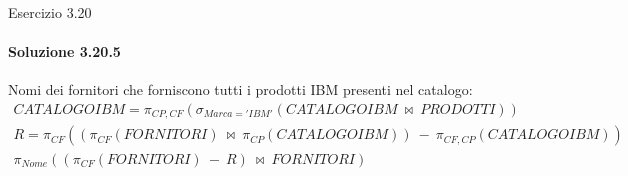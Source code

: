 %
\begin{frame}{Esercizio 3.20}
    \framesubtitle{Soluzione 3.20.5}
    \vspace*{-2cm}
    \vspace{.3cm}

    {\small Nomi dei fornitori che forniscono tutti i prodotti IBM presenti nel catalogo:}
    \small
    \begin{gather*}
        CATALOGOIBM = \pi_{CP,CF} (\sigma_{Marca='IBM'} (CATALOGOIBM~\bowtie~PRODOTTI))\\
        R = \pi_{CF}((\pi_{CF} (FORNITORI)~\bowtie~\pi_{CP}(CATALOGOIBM))~-~\pi_{CF,CP}(CATALOGOIBM))\\
        \pi_{Nome}((\pi_{CF}(FORNITORI)~-~R)~\bowtie~FORNITORI)
    \end{gather*}
\end{frame}